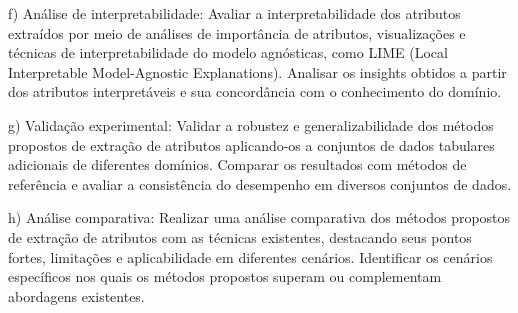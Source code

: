 \documentclass{article}
\begin{document}
f) Análise de interpretabilidade: Avaliar a interpretabilidade dos atributos extraídos por meio de análises de importância de atributos, visualizações e técnicas de interpretabilidade do modelo agnósticas, como LIME (Local Interpretable Model-Agnostic Explanations). Analisar os insights obtidos a partir dos atributos interpretáveis e sua concordância com o conhecimento do domínio.

g) Validação experimental: Validar a robustez e generalizabilidade dos métodos propostos de extração de atributos aplicando-os a conjuntos de dados tabulares adicionais de diferentes domínios. Comparar os resultados com métodos de referência e avaliar a consistência do desempenho em diversos conjuntos de dados.

h) Análise comparativa: Realizar uma análise comparativa dos métodos propostos de extração de atributos com as técnicas existentes, destacando seus pontos fortes, limitações e aplicabilidade em diferentes cenários. Identificar os cenários específicos nos quais os métodos propostos superam ou complementam abordagens existentes. 

   
 



\end{document}
